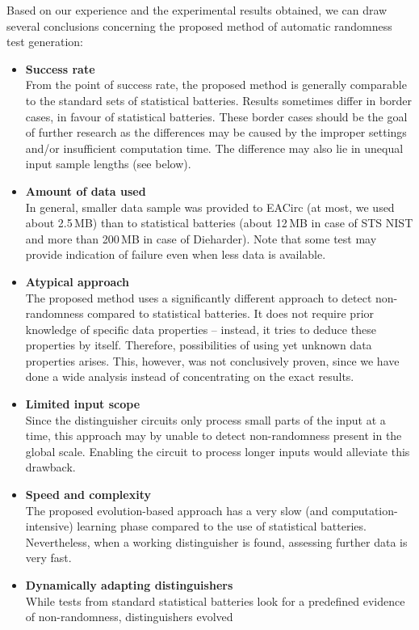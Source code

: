 \documentclass[12pt,oneside]{fithesis2}
\newcommand{\squarebullet}{\textcolor{black}{\raisebox{0.15em}{\rule{4pt}{4pt}}}}
\newenvironment{myItemize}{
  \begin{itemize}[leftmargin=2em,rightmargin=1em,itemsep=\parskip ,parsep=0em,topsep=0em,partopsep=0em]
  \renewcommand{\labelitemi}{\squarebullet}
  \renewcommand{\labelitemii}{$\diamond$}
}{
  \end{itemize}
}
\begin{document}
Based on our experience and the experimental results obtained, we can draw several conclusions concerning the proposed
method of automatic randomness test generation:
\begin{myItemize}
\item \textbf{Success rate}\\
From the point of success rate, the proposed method is generally comparable to the standard sets of statistical batteries.
Results sometimes differ in border cases, in favour of statistical batteries.
These border cases should be the goal of further research as the differences may
be caused by the improper settings and/or insufficient computation time. The difference may also lie in unequal input sample lengths
(see below).
\item \textbf{Amount of data used}\\
In general, smaller data sample was provided to EACirc (at most, we used about 2.5\,MB) than to statistical batteries
(about 12\,MB in case of STS NIST and more than 200\,MB in case of Dieharder). Note that some test may provide indication
of failure even when less data is available.
\item \textbf{Atypical approach}\\
The proposed method uses a significantly different approach to detect non-randomness compared to statistical batteries.
It does not require prior knowledge of specific data properties -- instead, it tries to deduce these properties by itself.
Therefore, possibilities of using yet unknown data properties arises. This, however, was not conclusively proven, 
since we have done a wide analysis instead of concentrating on the exact results.
\item \textbf{Limited input scope}\\
Since the distinguisher circuits only process small parts of the input at a time, this approach may by unable to detect
non-randomness present in the global scale. Enabling the circuit to process longer inputs would alleviate this drawback.
\item \textbf{Speed and complexity}\\
The proposed evolution-based approach has a very slow (and computation-intensive) 
learning phase compared to the use of statistical batteries.
Nevertheless, when a working distinguisher is found, assessing further data is very fast.
\item \textbf{Dynamically adapting distinguishers}\\
While tests from standard statistical batteries look for a predefined evidence of non-randomness, distinguishers evolved

\end{myItemize}
\end{document}
